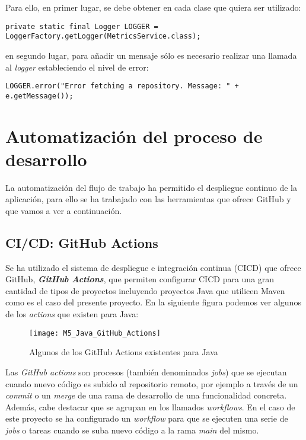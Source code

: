 Para ello, en primer lugar, se debe obtener en cada clase que quiera ser utilizado:\\
\begin{minipage}{\linewidth}
{\tiny
\begin{verbatim}
private static final Logger LOGGER = LoggerFactory.getLogger(MetricsService.class);
\end{verbatim}
}
\end{minipage}
en segundo lugar, para añadir un mensaje sólo es necesario realizar una llamada al \textit{logger} estableciendo el nivel de error:\\
\begin{minipage}{\linewidth}
{\tiny
\begin{verbatim}
LOGGER.error("Error fetching a repository. Message: " + e.getMessage());
\end{verbatim}
}
\end{minipage}


\section{Automatización del proceso de desarrollo}

La automatización del flujo de trabajo ha permitido el despliegue continuo de la aplicación, para ello se ha trabajado con las herramientas que ofrece GitHub y que vamos a ver a continuación.

\subsection{CI/CD: GitHub Actions}

Se ha utilizado el sistema de despliegue e integración continua (CICD) que ofrece GitHub, \textit{\textbf{GitHub Actions}}, que permiten configurar CICD para una gran cantidad de tipos de proyectos incluyendo proyectos Java que utilicen Maven como es el caso del presente proyecto. En la siguiente figura podemos ver algunos de los \textit{actions} que existen para Java:

\begin{figure}[!h]
	\centering
	\texttt{[image: M5\_Java\_GitHub\_Actions]}
	\caption{Algunos de los GitHub Actions existentes para Java}\label{fig:M5_Java_GitHub_Actions}
\end{figure}
\FloatBarrier


Las \textit{GitHub actions} son procesos (también denominados \textit{jobs}) que se ejecutan cuando nuevo código es subido al repositorio remoto, por ejemplo a través de un \textit{commit} o un \textit{merge} de una rama de desarrollo de una funcionalidad concreta. Además, cabe destacar que se agrupan en los llamados \textit{workflows}.
En el caso de este proyecto se ha configurado un \textit{workflow} para que se ejecuten una serie de \textit{jobs} o tareas cuando se suba nuevo código a la rama \textit{main} del mismo.

